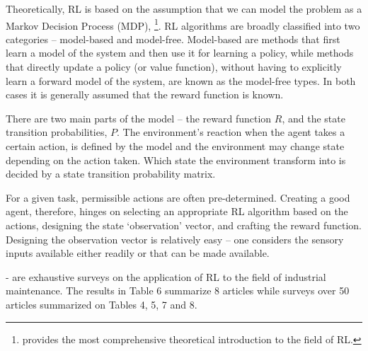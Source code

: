 \documentclass{article}
\begin{document}
Theoretically, RL is based on the assumption that we can model the problem as a Markov Decision Process (MDP), \citep{sutton2018}\footnote{\citet{sutton2018} provides the most comprehensive theoretical introduction to the field of RL.}. 
RL algorithms are broadly classified into two categories -- model-based and model-free. Model-based are methods that first learn a model of the system and then use it for learning a policy, while methods that directly update a policy (or value function), without having to explicitly learn a forward model of the system, are known as the model-free types. In both cases it is generally assumed that the reward function is known.

There are two main parts of the model -- the reward function $R$, and the state transition probabilities, $P$. The environment's reaction when the agent takes a certain action, is defined by the model and the environment may change state depending on the action taken. Which state the environment transform into is decided by a state transition probability matrix. 

For a given task, permissible actions are often pre-determined. Creating a good agent, therefore, hinges on selecting an appropriate RL algorithm based on the actions, designing the state `observation' vector, and crafting the reward function. Designing the observation vector is relatively easy -- one considers the sensory inputs available either readily or that can be made available. 

\citep{siraskar2023, panzer2022} - are exhaustive surveys on the application of RL to the field of industrial maintenance. The results in Table 6 \citep{panzer2022} summarize 8 articles while \citep{siraskar2023} surveys over 50 articles summarized on Tables 4, 5, 7 and 8.
\end{document}
